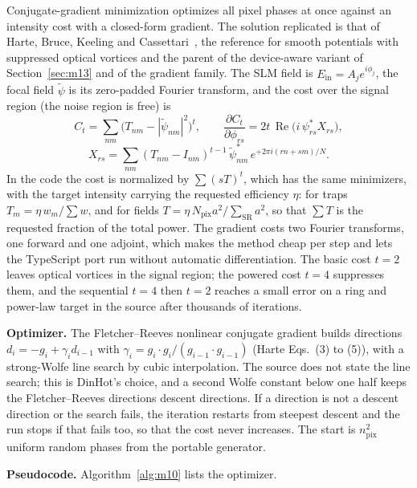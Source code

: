 Conjugate-gradient minimization optimizes all pixel phases at once against an intensity cost with a closed-form gradient. The solution replicated is that of Harte, Bruce, Keeling and Cassettari~\cite{harte}, the reference for smooth potentials with suppressed optical vortices and the parent of the device-aware variant of Section~\ref{sec:m13} and of the gradient family. The SLM field is $E_{\mathrm{in}}=A_je^{i\phi_j}$, the focal field $\tilde\psi$ is its zero-padded Fourier transform, and the cost over the signal region (the noise region is free) is
\begin{equation}
C_t=\sum_{nm}\big(T_{nm}-|\tilde\psi_{nm}|^2\big)^t,\qquad
\frac{\partial C_t}{\partial\phi_{rs}}=2t\,\operatorname{Re}\big(i\,\psi_{rs}^*X_{rs}\big),
\label{eq:m10}
\end{equation}
\begin{equation}
X_{rs}=\sum_{nm}(T_{nm}-I_{nm})^{t-1}\,\tilde\psi_{nm}^*\,e^{+2\pi i(rn+sm)/N}.
\label{eq:m10-x}
\end{equation}
In the code the cost is normalized by $\sum(sT)^t$, which has the same minimizers, with the target intensity carrying the requested efficiency $\eta$: for traps $T_m=\eta\,w_m/\sum w$, and for fields $T=\eta\,N_{\mathrm{pix}}a^2/\sum_{\mathrm{SR}}a^2$, so that $\sum T$ is the requested fraction of the total power. The gradient costs two Fourier transforms, one forward and one adjoint, which makes the method cheap per step and lets the TypeScript port run without automatic differentiation. The basic cost $t=2$ leaves optical vortices in the signal region; the powered cost $t=4$ suppresses them, and the sequential $t=4$ then $t=2$ reaches a small error on a ring and power-law target in the source after thousands of iterations.

\textbf{Optimizer.} The Fletcher--Reeves nonlinear conjugate gradient builds directions $d_i=-g_i+\gamma_id_{i-1}$ with $\gamma_i=g_i\cdot g_i/(g_{i-1}\cdot g_{i-1})$ (Harte Eqs.~(3) to (5)), with a strong-Wolfe line search by cubic interpolation. The source does not state the line search; this is DinHot's choice, and a second Wolfe constant below one half keeps the Fletcher--Reeves directions descent directions. If a direction is not a descent direction or the search fails, the iteration restarts from steepest descent and the run stops if that fails too, so that the cost never increases. The start is $n_{\mathrm{pix}}^2$ uniform random phases from the portable generator.

\textbf{Pseudocode.} Algorithm~\ref{alg:m10} lists the optimizer.

